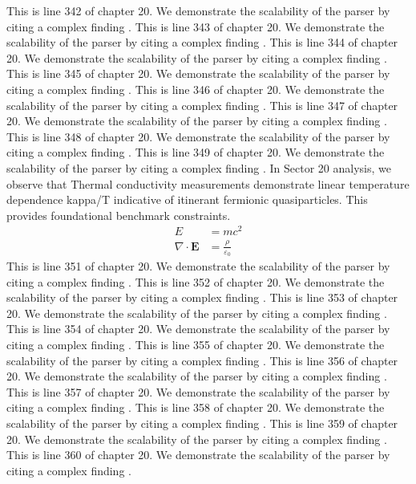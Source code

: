 This is line 342 of chapter 20. We demonstrate the scalability of the parser by citing a complex finding \cite{ref20_342}.
This is line 343 of chapter 20. We demonstrate the scalability of the parser by citing a complex finding \cite{ref20_343}.
This is line 344 of chapter 20. We demonstrate the scalability of the parser by citing a complex finding \cite{ref20_344}.
This is line 345 of chapter 20. We demonstrate the scalability of the parser by citing a complex finding \cite{ref20_345}.
This is line 346 of chapter 20. We demonstrate the scalability of the parser by citing a complex finding \cite{ref20_346}.
This is line 347 of chapter 20. We demonstrate the scalability of the parser by citing a complex finding \cite{ref20_347}.
This is line 348 of chapter 20. We demonstrate the scalability of the parser by citing a complex finding \cite{ref20_348}.
This is line 349 of chapter 20. We demonstrate the scalability of the parser by citing a complex finding \cite{ref20_349}.
In Sector 20 analysis, we observe that Thermal conductivity measurements demonstrate linear temperature dependence kappa/T indicative of itinerant fermionic quasiparticles. This provides foundational benchmark constraints.
\begin{align*}
  E &= mc^2 \\
  \nabla \cdot \mathbf{E} &= \frac{\rho}{\varepsilon_0}
\end{align*}
This is line 351 of chapter 20. We demonstrate the scalability of the parser by citing a complex finding \cite{ref20_351}.
This is line 352 of chapter 20. We demonstrate the scalability of the parser by citing a complex finding \cite{ref20_352}.
This is line 353 of chapter 20. We demonstrate the scalability of the parser by citing a complex finding \cite{ref20_353}.
This is line 354 of chapter 20. We demonstrate the scalability of the parser by citing a complex finding \cite{ref20_354}.
This is line 355 of chapter 20. We demonstrate the scalability of the parser by citing a complex finding \cite{ref20_355}.
This is line 356 of chapter 20. We demonstrate the scalability of the parser by citing a complex finding \cite{ref20_356}.
This is line 357 of chapter 20. We demonstrate the scalability of the parser by citing a complex finding \cite{ref20_357}.
This is line 358 of chapter 20. We demonstrate the scalability of the parser by citing a complex finding \cite{ref20_358}.
This is line 359 of chapter 20. We demonstrate the scalability of the parser by citing a complex finding \cite{ref20_359}.
This is line 360 of chapter 20. We demonstrate the scalability of the parser by citing a complex finding \cite{ref20_360}.
